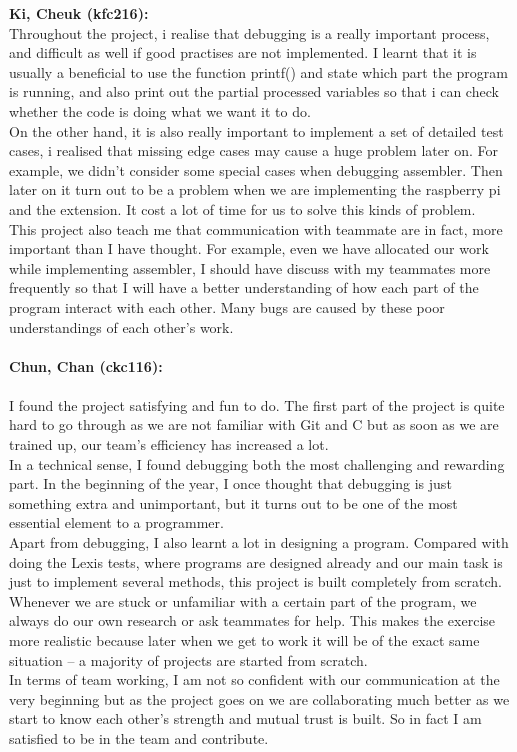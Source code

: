 \documentclass[11pt]{article}
\begin{document}
\textbf{Ki, Cheuk (kfc216):}
\\Throughout the project, i realise that debugging is a really important process, and difficult as well if good practises are not implemented. I learnt that it is usually a beneficial  to use the function printf() and state which part the program is running, and also print out the partial processed variables so that i can check whether the code is doing what we want it to do.
\\On the other hand, it is also really important to implement a set of detailed test cases, i realised that missing edge cases may cause a huge problem later on. For example, we didn’t consider some special cases when debugging assembler. Then later on it turn out to be a problem when we are implementing the raspberry pi and the extension. It cost a lot of time for us to solve this kinds of problem. 
\\This project also teach me that communication with teammate are in fact, more important than I have thought. For example, even we have allocated our work while implementing assembler, I should have discuss with my teammates more frequently so that I will have a better understanding of how each part of the program interact with each other. Many bugs are caused by these poor understandings of each other's work.
\\
\\
\textbf{Chun, Chan (ckc116):}
\\
\\
I found the project satisfying and fun to do. The first part of the project is quite hard to go through as we are not familiar with Git and C but as soon as we are trained up, our team’s efficiency has increased a lot.
\\In a technical sense, I found debugging both the most challenging and rewarding part. In the beginning of the year, I once thought that debugging is just something extra and unimportant, but it turns out to be one of the most essential element to a programmer. 
\\Apart from debugging, I also learnt a lot in designing a program. Compared with doing the Lexis tests, where programs are designed already and our main task is just to implement several methods, this project is built completely from scratch. Whenever we are stuck or unfamiliar with a certain part of the program, we always do our own research or ask teammates for help. This makes the exercise more realistic because later when we get to work it will be of the exact same situation -- a majority of projects are started from scratch.
\\In terms of team working, I am not so confident with our communication at the very beginning but as the project goes on we are collaborating much better as we start to know each other’s strength and mutual trust is built. So in fact I am satisfied to be in the team and contribute.
\end{document}
